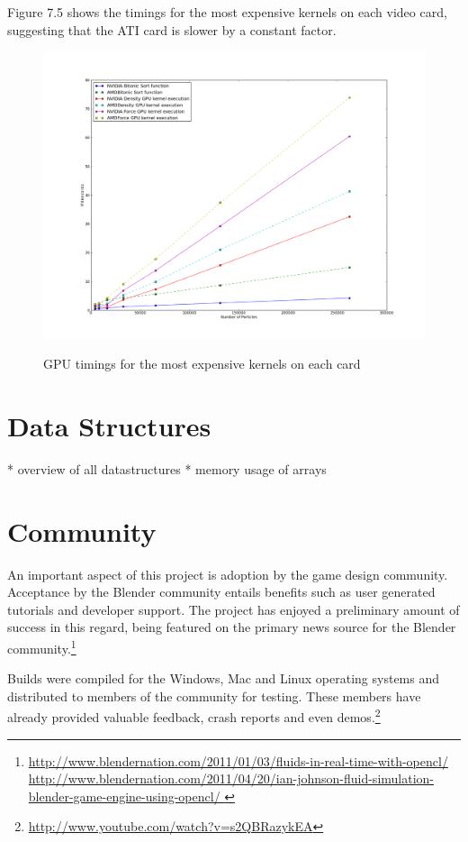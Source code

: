 \pagebreak
Figure 7.5 shows the timings for the most expensive kernels on each video card,
suggesting that the ATI card is slower by a constant factor.

\begin{figure}[!htc]
 		\centering
		\includegraphics[scale=0.4]{figures/nv_vs_ati.png}
		\label{fig:logic}
        \caption{ GPU timings for the most expensive kernels on each card }
\end{figure}


\pagebreak
\section{Data Structures}
* overview of all datastructures
* memory usage of arrays

\section{Community}


An important aspect of this project is adoption by the game design community.
Acceptance by the Blender community entails benefits such as user generated
tutorials and developer support. The project has enjoyed a preliminary amount
of success in this regard, being featured on the primary news source for
the Blender community.\footnote{
\url{http://www.blendernation.com/2011/01/03/fluids-in-real-time-with-opencl/}
\\ 
\url{
http://www.blendernation.com/2011/04/20/ian-johnson-fluid-simulation-blender-game-engine-using-opencl/
} }

Builds were compiled for the Windows, Mac and Linux operating systems and
distributed to members of the community for testing. These members have already
provided valuable feedback, crash reports and even demos.\footnote{ \url{http://www.youtube.com/watch?v=s2QBRazykEA}} 

